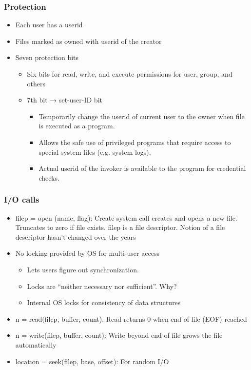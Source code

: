 \documentclass[12pt]{article}
\begin{document}
\subsubsection{Protection}
\begin{itemize}
    \item Each user has a userid
    \item Files marked as owned with userid of the creator
    \item Seven protection bits \begin{itemize}
        \item Six bits for read, write, and execute permissions for user, group, and others
        \item 7th bit → set-user-ID bit \begin{itemize}
            \item Temporarily change the userid of current user to the owner when file is executed as a program.
            \item Allows the safe use of privileged programs that require access to special system files (e.g. system logs).
            \item Actual userid of the invoker is available to the program for credential checks.
        \end{itemize}
    \end{itemize}
\end{itemize}
\subsubsection{I/O calls}
\begin{itemize}
    \item filep = open (name, flag): Create system call creates and opens a new file. Truncates to zero if file exists. filep is a file descriptor. Notion of a file descriptor hasn’t changed over the years
    \item No locking provided by OS for multi-user access \begin{itemize}
        \item Lets users figure out synchronization. 
        \item Locks are “neither necessary nor sufficient”. Why?
        \item Internal OS locks for consistency of data structures
    \end{itemize} 
    \item n = read(filep, buffer, count): Read returns 0 when end of file (EOF) reached 
    \item n = write(filep, buffer, count): Write beyond end of file grows the file automatically 
    \item location = seek(filep, base, offset): For random I/O
\end{itemize}
\end{document}
